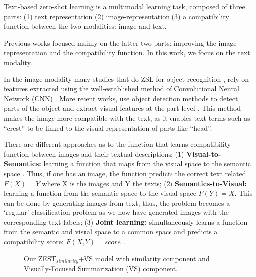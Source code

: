 \documentclass[11pt,a4paper]{article}
\begin{document}
Text-based zero-shot learning is a multimodal learning task, composed of three parts: (1) text representation (2) image-representation (3) a compatibility function between the two modalities: image and text. \par

Previous works focused mainly on the latter two parts: improving the image representation and the compatibility function. In this work, we focus on the text modality. \par

In the image modality many studies that do ZSL for object recognition \cite{xu2018attngan,lei2015predicting,qiao2016less,akata2016multi}, rely on features extracted using the well-established method of
Convolutional Neural Network (CNN) \cite{lecun1995convolutional}. More recent works, use object detection methods to detect parts of the object and extract visual features at the part-level \cite{elhoseiny2017link,zhu2018generative,zhang2016spda}. This
method makes the image more compatible with the text, as it enables text-terms such as \enquote{crest} to be linked to the visual representation of parts like \enquote{head}. \par



There are different approaches as to the function that learns compatibility function between images and their textual descriptions: (1) \textbf{Visual-to-Semantics:} learning a function that maps from the visual space to the semantic space \citep{socher2013zero}. Thus, if one has an image, the function predicts the correct text related $F(X)=Y$ where X is the images and Y the texts; (2) \textbf{Semantics-to-Visual:} learning a function from the semantic space to the visual space \citet{zhu2018generative} $F(Y)=X$. This can be done by generating images from text, thus, the problem becomes a \enquote*{regular} classification problem as we now have generated images with the corresponding text labels; (3) \textbf{Joint learning:} simultaneously learns a function from the semantic and visual space to a common space and predicts a compatibility score: $F(X,Y)=score$  \cite{akata2015evaluation,akata2016multi,qiao2016less,elhoseiny2013write,elhoseiny2016write}.\par



\begin{figure}[t]
\centering
{}
 \caption{Our ZEST$_{similarity}$+VS model with similarity component and Visually-Focused Summarization (VS) component.}
\label{fig:data}
\end{figure}
\end{document}
